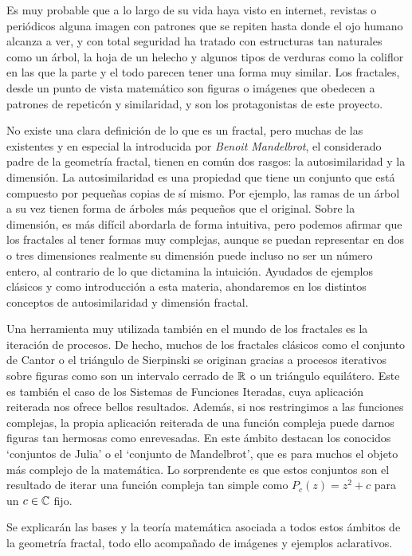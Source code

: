 
Es muy probable que a lo largo de su vida haya visto en internet, revistas o periódicos alguna imagen con patrones que se repiten hasta donde el ojo humano alcanza a ver, y con total seguridad ha tratado con estructuras tan naturales como un árbol, la hoja de un helecho y algunos tipos de verduras como la coliflor en las que la parte y el todo parecen tener una forma muy similar. Los fractales, desde un punto de vista matemático son figuras o imágenes que obedecen a patrones de repeticón y similaridad, y son los protagonistas de este proyecto.

No existe una clara definición de lo que es un fractal, pero muchas de las existentes y en especial la introducida por \textit{Benoit Mandelbrot}, el considerado padre de la geometría fractal, tienen en común dos rasgos: la autosimilaridad y la dimensión. La autosimilaridad es una propiedad que tiene un conjunto que está compuesto por pequeñas copias de sí mismo. Por ejemplo, las ramas de un árbol a su vez tienen forma de árboles más pequeños que el original. Sobre la dimensión, es más difícil abordarla de forma intuitiva, pero podemos afirmar que los fractales al tener formas muy complejas, aunque se puedan representar en dos o tres dimensiones realmente su dimensión puede incluso no ser un número entero, al contrario de lo que dictamina la intuición. Ayudados de ejemplos clásicos y como introducción a esta materia, ahondaremos en los distintos conceptos de autosimilaridad y dimensión fractal.

Una herramienta muy utilizada también en el mundo de los fractales es la iteración de procesos. De hecho, muchos de los fractales clásicos como el conjunto de Cantor o el triángulo de Sierpinski se originan gracias a procesos iterativos sobre figuras como son un intervalo cerrado de $\mathbb{R}$ o un triángulo equilátero. Este es también el caso de los Sistemas de Funciones Iteradas, cuya aplicación reiterada nos ofrece bellos resultados. Además, si nos restringimos a las funciones complejas, la propia aplicación reiterada de una función compleja puede darnos figuras tan hermosas como enrevesadas. En este ámbito destacan los conocidos `conjuntos de Julia' o el `conjunto de Mandelbrot', que es para muchos el objeto más complejo de la matemática. Lo sorprendente es que estos conjuntos son el resultado de iterar una función compleja tan simple como $P_c(z)=z^2+c$ para un $c\in\mathbb{C}$ fijo. 

Se explicarán las bases y la teoría matemática asociada a todos estos ámbitos de la geometría fractal, todo ello acompañado de imágenes y ejemplos aclarativos.


